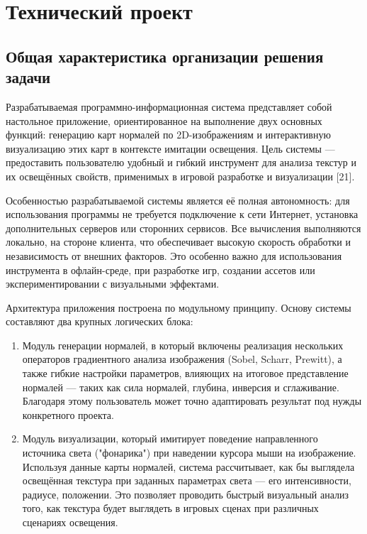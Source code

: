 \section{Технический проект}
\subsection{Общая характеристика организации решения задачи}

Разрабатываемая программно-информационная система представляет собой настольное приложение, ориентированное на выполнение двух основных функций: генерацию карт нормалей по 2D-изображениям и интерактивную визуализацию этих карт в контексте имитации освещения. Цель системы — предоставить пользователю удобный и гибкий инструмент для анализа текстур и их освещённых свойств, применимых в игровой разработке и визуализации [21].

Особенностью разрабатываемой системы является её полная автономность: для использования программы не требуется подключение к сети Интернет, установка дополнительных серверов или сторонних сервисов. Все вычисления выполняются локально, на стороне клиента, что обеспечивает высокую скорость обработки и независимость от внешних факторов. Это особенно важно для использования инструмента в офлайн-среде, при разработке игр, создании ассетов или экспериментировании с визуальными эффектами.

Архитектура приложения построена по модульному принципу. Основу системы составляют два крупных логических блока:
\begin{enumerate}
	\item Модуль генерации нормалей, в который включены реализация нескольких операторов градиентного анализа изображения (Sobel, Scharr, Prewitt), а также гибкие настройки параметров, влияющих на итоговое представление нормалей — таких как сила нормалей, глубина, инверсия и сглаживание. Благодаря этому пользователь может точно адаптировать результат под нужды конкретного проекта.
	\item Модуль визуализации, который имитирует поведение направленного источника света ("фонарика") при наведении курсора мыши на изображение. Используя данные карты нормалей, система рассчитывает, как бы выглядела освещённая текстура при заданных параметрах света — его интенсивности, радиусе, положении. Это позволяет проводить быстрый визуальный анализ того, как текстура будет выглядеть в игровых сценах при различных сценариях освещения.
\end{enumerate}

